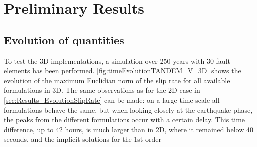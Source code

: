 \section{Preliminary Results}
\subsection{Evolution of quantities}

To test the 3D implementations, a simulation over 250 years with 30 fault elements has been performed. \autoref{fig:timeEvolutionTANDEM_V_3D} shows the evolution of the maximum Euclidian norm of the slip rate for all available formulations in 3D. The same observations as for the 2D case in \autoref{sec:Results_EvolutionSlipRate} can be made: on a large time scale all formulations behave the same, but when looking closely at the earthquake phase, the peaks from the different formulations occur with a certain delay. This time difference, up to 42 hours, is much larger than in 2D, where it \hfill remained \hfill below \hfill 40 \hfill seconds, \hfill and \hfill the \hfill implicit \hfill solutions \hfill for \hfill the \hfill 1st \hfill order 

